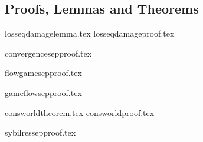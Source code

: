 \subsection{Proofs, Lemmas and Theorems}
{losseqdamagelemma.tex}
{losseqdamageproof.tex}

{convergencesepproof.tex}

{flowgamesepproof.tex}

{gameflowsepproof.tex}

{consworldtheorem.tex}
{consworldproof.tex}

{sybilressepproof.tex}

